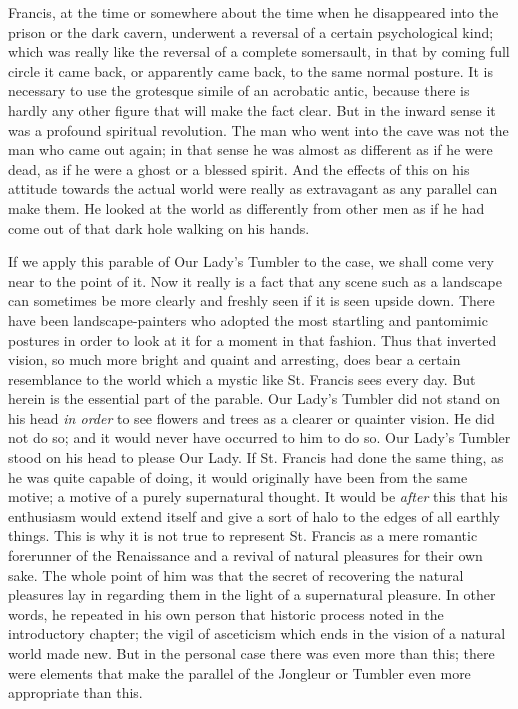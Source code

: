 \documentclass{book}
\begin{document}
Francis, at the time or somewhere about the time when he disappeared into the prison or the dark cavern, underwent a reversal of a certain psychological kind; which was really like the reversal of a complete somersault, in that by coming full circle it came back, or apparently came back, to the same normal posture. It is necessary to use the grotesque simile of an acrobatic antic, because there is hardly any other figure that will make the fact clear. But in the inward sense it was a profound spiritual revolution. The man who went into the cave was not the man who came out again; in that sense he was almost as different as if he were dead, as if he were a ghost or a blessed spirit. And the effects of this on his attitude towards the actual world were really as extravagant as any parallel can make them. He looked at the world as differently from other men as if he had come out of that dark hole walking on his hands.

If we apply this parable of Our Lady’s Tumbler to the case, we shall come very near to the point of it. Now it really is a fact that any scene such as a landscape can sometimes be more clearly and freshly seen if it is seen upside down. There have been landscape-painters who adopted the most startling and pantomimic postures in order to look at it for a moment in that fashion. Thus that inverted vision, so much more bright and quaint and arresting, does bear a certain resemblance to the world which a mystic like St. Francis sees every day. But herein is the essential part of the parable. Our Lady’s Tumbler did not stand on his head \emph{in order} to see flowers and trees as a clearer or quainter vision. He did not do so; and it would never have occurred to him to do so. Our Lady’s Tumbler stood on his head to please Our Lady. If St. Francis had done the same thing, as he was quite capable of doing, it would originally have been from the same motive; a motive of a purely supernatural thought. It would be \emph{after} this that his enthusiasm would extend itself and give a sort of halo to the edges of all earthly things. This is why it is not true to represent St. Francis as a mere romantic forerunner of the Renaissance and a revival of natural pleasures for their own sake. The whole point of him was that the secret of recovering the natural pleasures lay in regarding them in the light of a supernatural pleasure. In other words, he repeated in his own person that historic process noted in the introductory chapter; the vigil of asceticism which ends in the vision of a natural world made new. But in the personal case there was even more than this; there were elements that make the parallel of the Jongleur or Tumbler even more appropriate than this.
\end{document}
